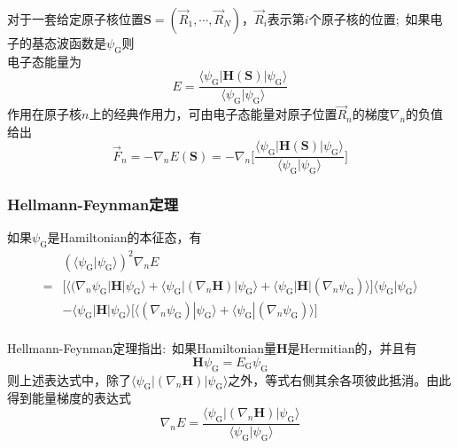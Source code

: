 {{	对于一套给定原子核位置$\mathbf{S}=(\vec R_1,\cdots,\vec R_N)$，$\vec R_i$表示第$i$个原子核的位置;~如果电子的基态波函数是$\psi_{\mathrm{G}}$则\\电子态能量为
	\begin{displaymath}
		E=\dfrac{\langle\psi_{\mathrm{G}}|\mathbf{H}(\mathbf{S})|\psi_{\mathrm{G}}\rangle}{\langle\psi_{\mathrm{G}}|\psi_{\mathrm{G}}\rangle}
	\end{displaymath}
作用在原子核$n$上的经典作用力，可由电子态能量对原子位置$\vec R_n$的梯度$\nabla_n$的负值给出
\begin{displaymath}
	\vec F_n=-\nabla_nE(\mathbf{S})=-\nabla_n\bigg[\dfrac{\langle\psi_{\mathrm{G}}|\mathbf{H}(\mathbf{S})|\psi_{\mathrm{G}}\rangle}{\langle\psi_{\mathrm{G}}|\psi_{\mathrm{G}}\rangle}\bigg]
\end{displaymath}
}

\frame
{
	\frametitle{\textrm{Hellmann-Feynman}定理}
	如果$\psi_{\mathrm{G}}$是\textrm{Hamiltonian}的本征态，有
	\begin{displaymath}
		\begin{aligned}
			&(\langle\psi_{\mathrm{G}}|\psi_{\mathrm{G}}\rangle)^2\nabla_nE\\
			=&\big[\langle(\nabla_n\psi_{\mathrm{G}}|\mathbf{H}|\psi_{\mathrm{G}}\rangle+\langle\psi_{\mathrm{G}}|(\nabla_n\mathbf{H})|\psi_{\mathrm{G}}\rangle+\langle\psi_{\mathrm{G}}|\mathbf{H}|(\nabla_n\psi_{\mathrm{G}})\rangle\big]\langle\psi_{\mathrm{G}}|\psi_{\mathrm{G}}\rangle\\
			&-\langle\psi_{\mathrm{G}}|\mathbf{H}|\psi_{\mathrm{G}}\rangle\big[\langle(\nabla_n\psi_{\mathrm{G}})|\psi_{\mathrm{G}}\rangle+\langle\psi_{\mathrm{G}}|(\nabla_n\psi_{\mathrm{G}})\rangle\big]
		\end{aligned}
	\end{displaymath}
	{\fontsize{6.2pt}{5.2pt}}\\
	\vskip 5pt
	\textrm{Hellmann-Feynman}定理指出:~如果\textrm{Hamiltonian}量$\mathbf{H}$是\textrm{Hermitian}的，并且有
	\begin{displaymath}
		\mathbf{H}\psi_{\mathrm{G}}=E_{\mathrm{G}}\psi_{\mathrm{G}}
	\end{displaymath}
则上述表达式中，除了$\langle\psi_{\mathrm{G}}|(\nabla_n\mathbf{H})|\psi_{\mathrm{G}}\rangle$之外，等式右侧其余各项彼此抵消。由此得到能量梯度的表达式
\begin{displaymath}
	\nabla_nE=\dfrac{\langle\psi_{\mathrm{G}}|(\nabla_n\mathbf{H})|\psi_{\mathrm{G}}\rangle}{\langle\psi_{\mathrm{G}}|\psi_{\mathrm{G}}\rangle}
\end{displaymath}
}

}
